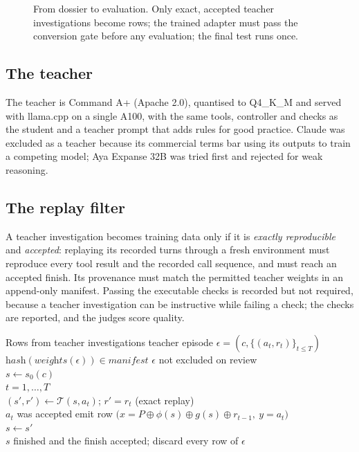 \begin{figure}[t]\centering
\resizebox{\linewidth}{!}{}
\caption{From dossier to evaluation. Only exact, accepted teacher investigations become rows; the trained adapter must
pass the conversion gate before any evaluation; the final test runs once.}
\label{fig:pipeline}
\end{figure}

\subsection{The teacher}
The teacher is Command A+ \citep{commandaplus} (Apache 2.0), quantised to Q4\_K\_M and served with llama.cpp
\citep{llamacpp} on a single A100, with the same tools, controller and checks as the student and a teacher prompt that
adds rules for good practice. Claude was excluded as a teacher because its commercial terms bar using its outputs to
train a competing model; Aya Expanse 32B was tried first and rejected for weak reasoning.

\subsection{The replay filter}
A teacher investigation becomes training data only if it is \emph{exactly reproducible} and \emph{accepted}: replaying
its recorded turns through a fresh environment must reproduce every tool result and the recorded call sequence, and must
reach an accepted finish. Its provenance must match the permitted teacher weights in an append-only manifest. Passing the
executable checks is recorded but not required, because a teacher investigation can be instructive while failing a
check; the checks are reported, and the judges score quality.

\begin{algo}{Rows from teacher investigations}\label{alg:rows}
 teacher episode $\epsilon = (c, \{(a_t, r_t)\}_{t\le T})$ \\
\hspace*{1.2em}  $\textit{hash}(\textit{weights}(\epsilon)) \in \textit{manifest}$  $\epsilon$ not excluded on review\\
\hspace*{1.2em} $s \gets s_0(c)$\\
\hspace*{1.2em}  $t = 1,\dots,T$ \\
\hspace*{2.4em} $(s', r') \gets \mathcal{T}(s, a_t)$;  $r' = r_t$ \hfill (exact replay)\\
\hspace*{2.4em}  $a_t$ was accepted  emit row $\bigl(x = P \oplus \phi(s) \oplus g(s) \oplus r_{t-1},\ y = a_t\bigr)$\\
\hspace*{2.4em} $s \gets s'$\\
\hspace*{1.2em}  $s$ finished and the finish accepted;  discard every row of $\epsilon$
\end{algo}

